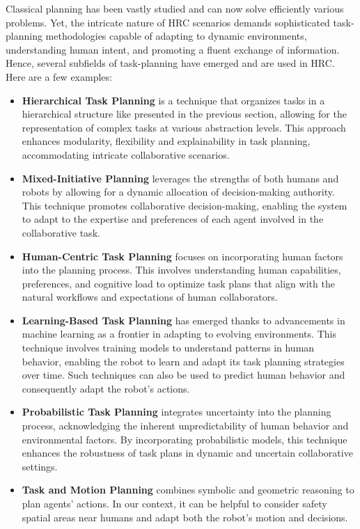 Classical planning has been vastly studied and can now solve efficiently various problems. Yet, the intricate nature of HRC scenarios demands sophisticated task-planning methodologies capable of adapting to dynamic environments, understanding human intent, and promoting a fluent exchange of information. Hence, several subfields of task-planning have emerged and are used in HRC. Here are a few examples:

\begin{itemize}
    \item \textbf{Hierarchical Task Planning} is a technique that organizes tasks in a hierarchical structure like presented in the previous section, allowing for the representation of complex tasks at various abstraction levels. This approach enhances modularity, flexibility and explainability in task planning, accommodating intricate collaborative scenarios.
    
    \item \textbf{Mixed-Initiative Planning} leverages the strengths of both humans and robots by allowing for a dynamic allocation of decision-making authority. This technique promotes collaborative decision-making, enabling the system to adapt to the expertise and preferences of each agent involved in the collaborative task.
    
    \item \textbf{Human-Centric Task Planning} focuses on incorporating human factors into the planning process. This involves understanding human capabilities, preferences, and cognitive load to optimize task plans that align with the natural workflows and expectations of human collaborators.
    
    \item \textbf{Learning-Based Task Planning} has emerged thanks to advancements in machine learning as a frontier in adapting to evolving environments. This technique involves training models to understand patterns in human behavior, enabling the robot to learn and adapt its task planning strategies over time. Such techniques can also be used to predict human behavior and consequently adapt the robot's actions.
    
    \item \textbf{Probabilistic Task Planning} integrates uncertainty into the planning process, acknowledging the inherent unpredictability of human behavior and environmental factors. By incorporating probabilistic models, this technique enhances the robustness of task plans in dynamic and uncertain collaborative settings.
    
    \item \textbf{Task and Motion Planning} combines symbolic and geometric reasoning to plan agents' actions. In our context, it can be helpful to consider safety spatial areas near humans and adapt both the robot's motion and decisions. 
    
\end{itemize}


